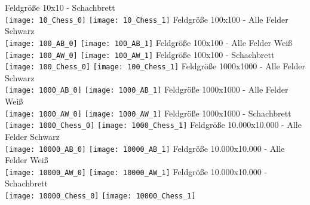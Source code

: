 \documentclass[
10pt, %
a4paper, %
oneside, %
headinclude,footinclude, %
BCOR5mm, %
]{scrartcl}
\begin{document}
\begin{appendix}
	Feldgröße 10x10 - Schachbrett\\
	\texttt{[image: 10\_Chess\_0]} 
	\texttt{[image: 10\_Chess\_1]} 
	Feldgröße 100x100 - Alle Felder Schwarz\\
	\texttt{[image: 100\_AB\_0]} 
	\texttt{[image: 100\_AB\_1]} 
	Feldgröße 100x100 - Alle Felder Weiß\\
	\texttt{[image: 100\_AW\_0]} 
	\texttt{[image: 100\_AW\_1]} 
	Feldgröße 100x100 - Schachbrett\\
	\texttt{[image: 100\_Chess\_0]} 
	\texttt{[image: 100\_Chess\_1]} 
	Feldgröße 1000x1000 - Alle Felder Schwarz\\
	\texttt{[image: 1000\_AB\_0]} 
	\texttt{[image: 1000\_AB\_1]} 
	Feldgröße 1000x1000 - Alle Felder Weiß\\
	\texttt{[image: 1000\_AW\_0]} 
	\texttt{[image: 1000\_AW\_1]} 
	Feldgröße 1000x1000 - Schachbrett\\
	\texttt{[image: 1000\_Chess\_0]} 
	\texttt{[image: 1000\_Chess\_1]} 
	Feldgröße 10.000x10.000 - Alle Felder Schwarz\\
	\texttt{[image: 10000\_AB\_0]} 
	\texttt{[image: 10000\_AB\_1]} 
	Feldgröße 10.000x10.000 - Alle Felder Weiß\\
	\texttt{[image: 10000\_AW\_0]} 
	\texttt{[image: 10000\_AW\_1]} 
	Feldgröße 10.000x10.000 - Schachbrett\\
	\texttt{[image: 10000\_Chess\_0]} 
	\texttt{[image: 10000\_Chess\_1]} 
	
	

	

	

	
	
	
\end{appendix} 
\end{document}
